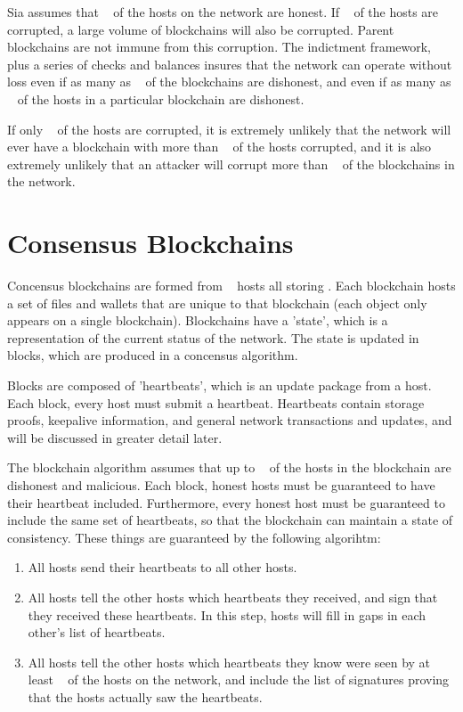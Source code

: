 \documentclass[twocolumn]{article}
\begin{document}
Sia assumes that \fiftyone ~ of the hosts on the network are honest.
If \fortynine ~ of the hosts are corrupted, a large volume of blockchains will also be corrupted.
Parent blockchains are not immune from this corruption.
The indictment framework, plus a series of checks and balances insures that the network can operate without loss even if as many as \maxcorruption ~ of the blockchains are dishonest, and even if as many as \maxcorruption ~ of the hosts in a particular blockchain are dishonest.

If only \fortynine ~ of the hosts are corrupted, it is extremely unlikely that the network will ever have a blockchain with more than \maxcorruption ~ of the hosts corrupted, and it is also extremely unlikely that an attacker will corrupt more than \maxcorruption ~ of the blockchains in the network.

\section{Consensus Blockchains}

Concensus blockchains are formed from \numhosts ~ hosts all storing \storageperhost.
Each blockchain hosts a set of files and wallets that are unique to that blockchain (each object only appears on a single blockchain).
Blockchains have a 'state', which is a representation of the current status of the network.
The state is updated in blocks, which are produced in a concensus algorithm.

Blocks are composed of 'heartbeats', which is an update package from a host.
Each block, every host must submit a heartbeat.
Heartbeats contain storage proofs, keepalive information, and general network transactions and updates, and will be discussed in greater detail later.

The blockchain algorithm assumes that up to \fortynine ~ of the hosts in the blockchain are dishonest and malicious.
Each block, honest hosts must be guaranteed to have their heartbeat included.
Furthermore, every honest host must be guaranteed to include the same set of heartbeats, so that the blockchain can maintain a state of consistency.
These things are guaranteed by the following algorihtm:

\begin{enumerate}
	\item All hosts send their heartbeats to all other hosts.
	\item All hosts tell the other hosts which heartbeats they received, and sign that they received these heartbeats.
	In this step, hosts will fill in gaps in each other's list of heartbeats.
	\item All hosts tell the other hosts which heartbeats they know were seen by at least \fiftyone ~ of the hosts on the network, and include the list of signatures proving that the hosts actually saw the heartbeats.
\end{enumerate}
\end{document}
